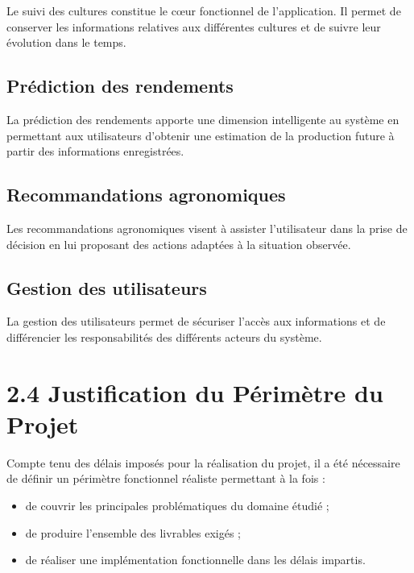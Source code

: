 \documentclass[12pt,a4paper]{report}
\begin{document}
Le suivi des cultures constitue le cœur fonctionnel de l'application. Il
permet de conserver les informations relatives aux différentes cultures
et de suivre leur évolution dans le temps.

\subsection{Prédiction des
rendements}\label{pruxe9diction-des-rendements}

La prédiction des rendements apporte une dimension intelligente au
système en permettant aux utilisateurs d'obtenir une estimation de la
production future à partir des informations enregistrées.

\subsection{Recommandations
agronomiques}\label{recommandations-agronomiques}

Les recommandations agronomiques visent à assister l'utilisateur dans la
prise de décision en lui proposant des actions adaptées à la situation
observée.

\subsection{Gestion des utilisateurs}\label{gestion-des-utilisateurs}

La gestion des utilisateurs permet de sécuriser l'accès aux informations
et de différencier les responsabilités des différents acteurs du
système.

\section{2.4 Justification du Périmètre du
Projet}\label{justification-du-puxe9rimuxe8tre-du-projet}

Compte tenu des délais imposés pour la réalisation du projet, il a été
nécessaire de définir un périmètre fonctionnel réaliste permettant à la
fois :

\begin{itemize}
\item
  de couvrir les principales problématiques du domaine étudié ;
\item
  de produire l'ensemble des livrables exigés ;
\item
  de réaliser une implémentation fonctionnelle dans les délais impartis.
\end{itemize}
\end{document}

